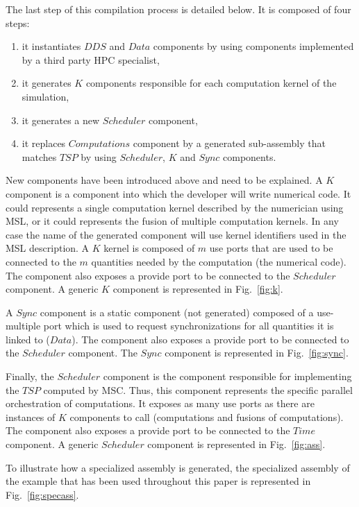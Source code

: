 The last step of this compilation process is detailed below. It is composed of four steps:
\begin{enumerate}
 \item it instantiates $DDS$ and $Data$ components by using components implemented by a third party HPC specialist,
 \item it generates $K$ components responsible for each computation kernel of the simulation,
 \item it generates a new $Scheduler$ component,
 \item it replaces $Computations$ component by a generated sub-assembly that matches $TSP$ by using $Scheduler$, $K$ and $Sync$ components.
 \end{enumerate}

New components have been introduced above and need to be explained. A $K$ component is a component into which the developer will write numerical code. It could represents a single computation kernel described by the numerician using MSL, or it could represents the fusion of multiple computation kernels. In any case the name of the generated component will use kernel identifiers used in the MSL description. A $K$ kernel is composed of $m$ use ports that are used to be connected to the $m$ quantities needed by the computation (\ie the numerical code). The component also exposes a provide port to be connected to the $Scheduler$ component. A generic $K$ component is represented in Fig.~\ref{fig:k}.

A $Sync$ component is a static component (not generated) composed of a use-multiple port which is used to request synchronizations for all quantities it is linked to ($Data$). The component also exposes a provide port to be connected to the $Scheduler$ component. The $Sync$ component is represented in Fig.~\ref{fig:sync}.

Finally, the $Scheduler$ component is the component responsible for implementing the $TSP$ computed by MSC. Thus, this component represents the specific parallel orchestration of  computations. It exposes as many use ports as there are instances of $K$ components to call (\ie computations and fusions of computations). The component also exposes a provide port to be connected to the $Time$ component. A generic $Scheduler$ component is represented in Fig.~\ref{fig:ass}.

To illustrate how a specialized assembly is generated, the specialized assembly of the example that has been used throughout this paper is represented in Fig.~\ref{fig:specass}. 


